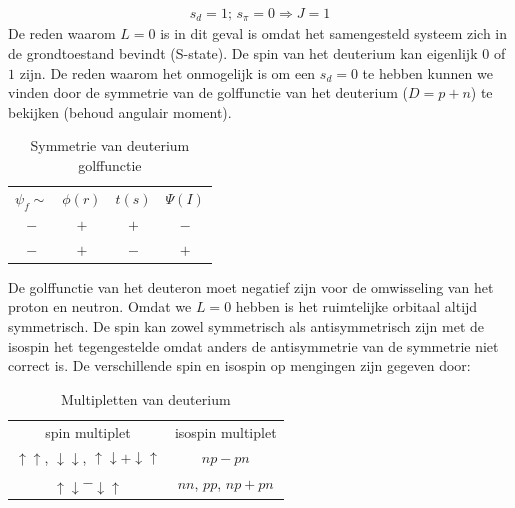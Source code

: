 \documentclass[../main.tex]{subfiles}
\begin{document}
\begin{equation}
    \begin{aligned}
        \label{eq:grondtoestand_deuteron}
        s_d=1\text{; }s_\pi=0 \Rightarrow J=1
    \end{aligned}
\end{equation}
De reden waarom $L=0$ is in dit geval is omdat het samengesteld systeem zich in de grondtoestand bevindt (S-state). De spin van het deuterium kan eigenlijk $0$ of $1$ zijn. De reden waarom het onmogelijk is om een $s_d=0$ te hebben kunnen we vinden door de symmetrie van de golffunctie van het deuterium ($D=p+n$) te bekijken (behoud angulair moment).

\begin{table}[h]
    \centering
    \caption{Symmetrie van deuterium golffunctie}
    \label{tab:sym_deut_golf}
    \begin{tabular}{cccc}
        $\psi_f\sim$ & $\phi(r)$ & $t(s)$                & $\Psi(I)$             \\
        $-$             & $+$       & {\color{green} $+$}   & {\color{green} $-$}   \\
        $-$             & $+$       & {\color{red} $-$}     & {\color{red} $+$}     \\
    \end{tabular}
\end{table}

De golffunctie van het deuteron moet negatief zijn voor de omwisseling van het proton en neutron. Omdat we $L=0$ hebben is het ruimtelijke orbitaal altijd symmetrisch. De spin kan zowel symmetrisch als antisymmetrisch zijn met de isospin het tegengestelde omdat anders de antisymmetrie van de symmetrie niet correct is. De verschillende spin en isospin op mengingen zijn gegeven door:

\begin{table}[h]
    \centering
    \caption{Multipletten van deuterium}
    \label{tab:mult_deut}
    \begin{tabular}{cc}
        spin multiplet & isospin multiplet \\
        {\color{green} $\uparrow\uparrow$, $\downarrow\downarrow$, $\uparrow\downarrow+\downarrow\uparrow$} & {\color{green} $np-pn$} \\
        {\color{red} $\uparrow\downarrow-\downarrow\uparrow$} & {\color{red} $nn$, $pp$, $np+pn$}
    \end{tabular}
\end{table}
\end{document}
